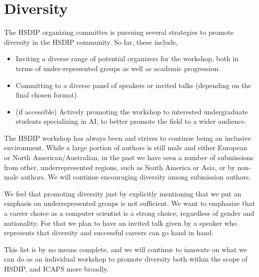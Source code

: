 \documentclass[10pt]{article}
\begin{document}
\section*{Diversity}
The HSDIP organizing committee is pursuing several strategies to promote
diversity in the HSDIP community. So far, these include,

\begin{itemize}
  \item Inviting a diverse range of potential organizers for the workshop,
  both in terms of under-represented groups as well as academic progression.
  \item Committing to a diverse panel of speakers or invited talks (depending
  on the final chosen format).
  \item (if accessible) Actively promoting the workshop to interested undergraduate
  students specializing in AI, to better promote the field to a wider audience.
\end{itemize}
The HSDIP workshop has always been and strives to continue being an inclusive environment.
While a large portion of authors is still male and either European or North American/Australian, 
in the past we have seen a number of submissions from other, underrepresented regions, 
such as South America or Asia, or by non-male authors. We will continue encouraging 
diversity among submission authors.  

We feel that promoting diversity just by explicitly mentioning that we
put an emphasis on underrepresented groups is not sufficient. We
want to emphasize that a career choice as a computer scientist is a strong choice,
regardless of gender and nationality. For that we plan to have an invited talk
given by a speaker who represents that diversity and successful careers can go
hand in hand. 

This list is by no means complete, and we will continue to innovate on what
we can do as an individual workshop to promote diversity both within the scope
of HSDIP, and ICAPS more broadly.


\end{document}

